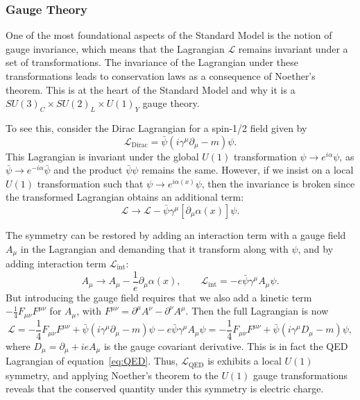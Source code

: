 \subsubsection{Gauge Theory}

One of the most foundational aspects of the Standard Model is the notion of gauge invariance, which means that the Lagrangian $\mathcal{L}$ remains invariant under a set of transformations.
The invariance of the Lagrangian under these transformations leads to conservation laws as a consequence of Noether's theorem.
This is at the heart of the Standard Model and why it is a $SU(3)_C\times SU(2)_L\times U(1)_Y$ gauge theory.

To see this, consider the Dirac Lagrangian for a spin-1/2 field given by
\begin{equation}
  \mathcal{L}_\mathrm{Dirac}=\bar{\psi}(i\gamma^\mu\partial_\mu-m)\psi.
\end{equation}
This Lagrangian is invariant under the global $U(1)$ transformation $\psi\to e^{i\alpha}\psi$, as $\bar{\psi}\to e^{-i\alpha}\bar{\psi}$ and the product $\bar{\psi}\psi$ remains the same.
However, if we insist on a local $U(1)$ transformation such that $\psi\to e^{i\alpha(x)}\psi$, then the invariance is broken since the transformed Lagrangian obtains an additional term:
\begin{equation}
  \mathcal{L}\to\mathcal{L}-\bar{\psi}\gamma^\mu[\partial_\mu\alpha(x)]\psi.
\end{equation}

The symmetry can be restored by adding an interaction term with a gauge field $A_\mu$ in the Lagrangian and demanding that it transform along with $\psi$, and by adding interaction term $\mathcal{L}_\mathrm{int}$:
\begin{equation}
  A_\mu\to A_\mu-\frac{1}{e}\partial_\mu\alpha(x),\qquad \mathcal{L}_\mathrm{int}=-e\bar{\psi}\gamma^\mu A_\mu\psi.
\end{equation}
But introducing the gauge field requires that we also add a kinetic term $-\frac{1}{4}F_{\mu\nu}F^{\mu\nu}$ for $A_\mu$, with $F^{\mu\nu}=\partial^\mu A^\nu-\partial^\nu A^\mu$.
Then the full Lagrangian is now
\begin{equation}
  \mathcal{L}=-\frac{1}{4}F_{\mu\nu}F^{\mu\nu}+\bar{\psi}(i\gamma^\mu\partial_\mu-m)\psi-e\bar{\psi}\gamma^\mu A_\mu\psi=-\frac{1}{4}F_{\mu\nu}F^{\mu\nu}+\bar{\psi}(i\gamma^\mu D_\mu-m)\psi,
\end{equation}
where $D_\mu=\partial_\mu+ieA_\mu$ is the gauge covariant derivative.
This is in fact the QED Lagrangian of equation~\ref{eq:QED}.
Thus, $\mathcal{L}_\mathrm{QED}$ is exhibits a local $U(1)$ symmetry, and applying Noether's theorem to the $U(1)$ gauge transformations reveals that the conserved quantity under this symmetry is electric charge.

